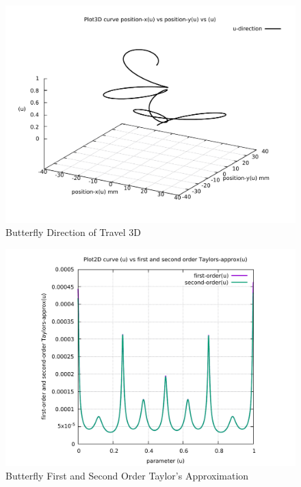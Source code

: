 \begin{figure}
	\caption     {Butterfly Direction of Travel 3D}
	\label{04-img-Butterfly Direction of Travel 3D.pdf}
	\includegraphics[width=1.00\textwidth]{Chap4/appendix/app-Butterfly/plots/04-img-Butterfly Direction of Travel 3D.pdf}
\end{figure}

\clearpage
\pagebreak

\begin{figure}
	\caption     {Butterfly First and Second Order Taylor's Approximation}
	\label{05-img-Butterfly-First-and-Second-Order-Taylors-Approx.pdf}
	\includegraphics[width=1.00\textwidth]{Chap4/appendix/app-Butterfly/plots/05-img-Butterfly-First-and-Second-Order-Taylors-Approx.pdf}
\end{figure}


